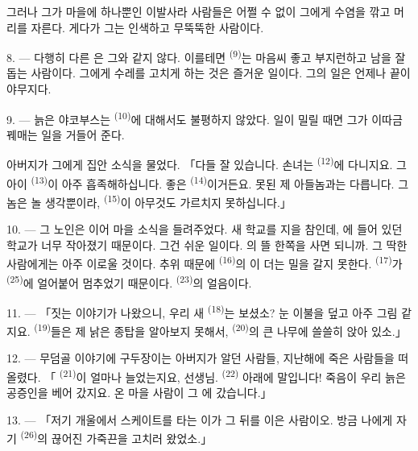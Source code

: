 그러나 그가 마을에 하나뿐인 이발사라 사람들은 어쩔 수 없이 그에게 수염을 깎고 머리를
자른다. 게다가 그는 인색하고 무뚝뚝한 사람이다.

8. --- 다행히 다른 은 그와 같지 않다. 이를테면 
\textsuperscript{(9)}는 마음씨 좋고 부지런하고 남을 잘 돕는 사람이다. 그에게 수레를 고치게
하는 것은 즐거운 일이다. 그의 일은 언제나 끝이 야무지다.

9. --- 늙은 야코부스는  \textsuperscript{(10)}에 대해서도 불평하지 않았다.
일이 밀릴 때면 그가 이따금  꿰매는 일을 거들어 준다.

아버지가 그에게 집안 소식을 물었다. 「다들 잘 있습니다. 손녀는 
\textsuperscript{(12)}에 다니지요. 그 아이  \textsuperscript{(13)}이 아주
흡족해하십니다. 좋은  \textsuperscript{(14)}이거든요. 못된 제 아들놈과는
다릅니다. 그놈은 놀 생각뿐이라,  \textsuperscript{(15)}이 아무것도 가르치지
못하십니다.」

\VUsaut{3.0mm}
\VUsaut{3.0mm}

10. --- 그 노인은 이어 마을 소식을 들려주었다. 새 학교를 지을 참인데, 에
들어 있던 학교가 너무 작아졌기 때문이다. 그건 쉬운 일이다. 의 뜰
한쪽을 사면 되니까. 그 딱한 사람에게는 아주 이로울 것이다. 추위 때문에
 \textsuperscript{(16)}의 이 더는 밀을 갈지 못한다.
 \textsuperscript{(17)}가  \textsuperscript{(25)}에 얼어붙어
멈추었기 때문이다.  \textsuperscript{(23)}의 얼음이다.

11. --- 「짓는 이야기가 나왔으니, 우리 새  \textsuperscript{(18)}는 보셨소?
눈 이불을 덮고 아주 그림 같지요.  \textsuperscript{(19)}들은 제 낡은 종탑을
알아보지 못해서,  \textsuperscript{(20)}의 큰 나무에 쓸쓸히 앉아 있소.」

12. --- 무덤골 이야기에 구두장이는 아버지가 알던 사람들, 지난해에 죽은 사람들을 떠올렸다.
「 \textsuperscript{(21)}이 얼마나 늘었는지요, 선생님. 
\textsuperscript{(22)} 아래에 말입니다! 죽음이 우리 늙은 공증인을 베어 갔지요. 온 마을
사람이 그 에 갔습니다.」

13. --- 「저기 개울에서 스케이트를 타는 이가 그 뒤를 이은 사람이오. 방금 나에게
자기  \textsuperscript{(26)}의 끊어진 가죽끈을 고치러 왔었소.」

